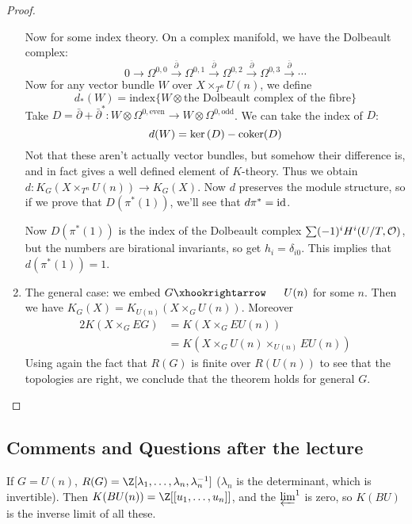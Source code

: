 \documentclass[11pt]{article}
\begin{document}
\begin{GuozhenEqKthy}
\begin{proof}
\begin{enumerate}
Now for some index theory. On a complex manifold, we have the Dolbeault complex:
\[0\to \Omega^{0,0}\overset{\overline\partial}{\to} \Omega^{0,1}\overset{\overline\partial}{\to} \Omega^{0,2}\overset{\overline\partial}{\to} \Omega^{0,3}\overset{\overline\partial}{\to}\cdots\]
 Now for any vector bundle $W$ over $X\times_{T^n}U(n)$, we define
\[d_*(W)=\text{index}\{W\otimes\text{the Dolbeault complex of the fibre}\}\]
Take $D=\bar\partial+\bar\partial^*:W\otimes \Omega^{0,\text{even}}\to W\otimes \Omega^{0,\text{odd}}$. We can take the index of $D$:
\[d(W)=\textup{ker}\,(D)-\operatorname{coker}(D)\]
Not that these aren't actually vector bundles, but somehow their difference is, and in fact gives a well defined element of $K$-theory. Thus we obtain $d:K_G(X\times_{T^n}U(n))\to K_G(X)$. Now $d$ preserves the module structure, so if we prove that $D(\pi^*(1))$, we'll see that $d\pi^*=\textup{id}$. 

Now $D(\pi^*(1))$ is the index of the Dolbeault complex $\sum (-1)^i H^i(U/T,\mathcal{O})$, but the  numbers are birational invariants, so get $h_i=\delta_{i0}$. This implies that $d(\pi^*(1))=1$.
%
\item The general case: we embed $G\cofibration U(n)$ for some $n$. Then we have $K_G(X)=K_{U(n)}(X\times_G U(n))$. Moreover
\begin{alignat*}{2}
K(X\times_G EG)&= K(X\times_G EU(n))\\
&=K(X\times_G U(n)\times_{U(n)}EU(n))
\end{alignat*}
Using again the fact that $R(G)$ is finite over $R(U(n))$ to see that the topologies are right, we conclude that the theorem holds for general $G$.\qedhere
\end{enumerate}
\end{proof}
\subsection*{Comments and Questions after the lecture}
If $G=U(n)$, $R(G)=\Z[\lambda_1,\ldots,\lambda_n,\lambda_n^{-1}]$ ($\lambda_n$ is the determinant, which is invertible). Then $K(BU(n))=\Z[[u_1,\ldots,u_n]]$, and the $\varprojlim^1$ is zero, so $K(BU)$ is the inverse limit of all these.

\pagebreak
\end{GuozhenEqKthy}
\end{document}
